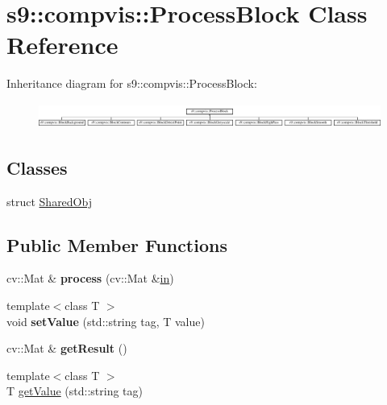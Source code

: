 \hypertarget{classs9_1_1compvis_1_1ProcessBlock}{\section{s9\-:\-:compvis\-:\-:\-Process\-Block \-Class \-Reference}
\label{classs9_1_1compvis_1_1ProcessBlock}
}
\-Inheritance diagram for s9\-:\-:compvis\-:\-:\-Process\-Block\-:\begin{figure}[H]
\begin{center}
\leavevmode
\includegraphics[height=0.842105cm]{classs9_1_1compvis_1_1ProcessBlock}
\end{center}
\end{figure}
\subsection*{\-Classes}
\begin{DoxyCompactItemize}
\item 
struct \hyperlink{structs9_1_1compvis_1_1ProcessBlock_1_1SharedObj}{\-Shared\-Obj}
\end{DoxyCompactItemize}
\subsection*{\-Public \-Member \-Functions}
\begin{DoxyCompactItemize}
\item 
\hypertarget{classs9_1_1compvis_1_1ProcessBlock_ac17fb013ecbc90008daeea97502540d2}{cv\-::\-Mat \& {\bfseries process} (cv\-::\-Mat \&\hyperlink{structin}{in})}\label{classs9_1_1compvis_1_1ProcessBlock_ac17fb013ecbc90008daeea97502540d2}

\item 
\hypertarget{classs9_1_1compvis_1_1ProcessBlock_a95e7672ada69c3f846380b2be57f193d}{{\footnotesize template$<$class T $>$ }\\void {\bfseries set\-Value} (std\-::string tag, \-T value)}\label{classs9_1_1compvis_1_1ProcessBlock_a95e7672ada69c3f846380b2be57f193d}

\item 
\hypertarget{classs9_1_1compvis_1_1ProcessBlock_ac5174987a6d59e389e95b8435fa57687}{cv\-::\-Mat \& {\bfseries get\-Result} ()}\label{classs9_1_1compvis_1_1ProcessBlock_ac5174987a6d59e389e95b8435fa57687}

\item 
{\footnotesize template$<$class T $>$ }\\\-T \hyperlink{classs9_1_1compvis_1_1ProcessBlock_a2189359475f02db5e99e699a4a9a5fa0}{get\-Value} (std\-::string tag)
\end{DoxyCompactItemize}
